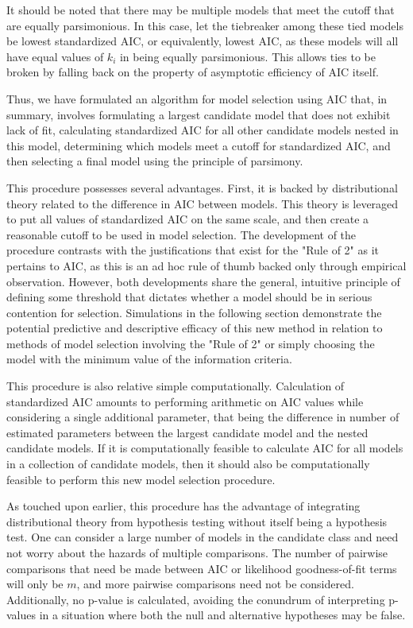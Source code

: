 		It should be noted that there may be multiple models that meet the cutoff that are equally parsimonious. In this case, let the tiebreaker among these tied models be
		lowest standardized AIC, or equivalently, lowest AIC, as these models will all have equal values of $k_i$ in being equally parsimonious. This allows ties to be broken
		by falling back on the property of asymptotic efficiency of AIC itself.

		Thus, we have formulated an algorithm for model selection using AIC that, in summary, involves formulating a largest candidate model that does not exhibit lack of
		fit, calculating standardized AIC for all other candidate models nested in this model, determining which models meet a cutoff for standardized AIC, and then selecting
		a final model using the principle of parsimony.

		This procedure possesses several advantages. First, it is backed by distributional theory related to the difference in AIC between models. This theory is leveraged
		to put all values of standardized AIC on the same scale, and then create a reasonable cutoff to be used in model selection. The development of the procedure
		contrasts with the justifications that exist for the "Rule of 2" as it pertains to AIC, as this is an ad hoc rule of thumb backed only through empirical
		observation. However, both developments share the general, intuitive principle of defining some threshold that dictates whether a model should be in serious
		contention for selection. Simulations in the following section demonstrate the potential predictive and descriptive efficacy of this new method in relation
		to methods of model selection involving the "Rule of 2" or simply choosing the model with the minimum value of the information criteria.
		
		This procedure is also relative simple computationally. Calculation of standardized AIC amounts to performing arithmetic on AIC values while considering
		a single additional parameter, that being the difference in number of estimated parameters between the largest candidate model and the nested candidate 
		models. If it is computationally feasible to calculate AIC for all models in a collection of candidate models, then it should also be computationally
		feasible to perform this new model selection procedure.
		
		As touched upon earlier, this procedure has the advantage of integrating distributional theory from hypothesis testing without itself being a hypothesis test.
		One can consider a large number of models in the candidate class and need not worry about the hazards of multiple comparisons. The number of pairwise comparisons
		that need be made between AIC or likelihood goodness-of-fit terms will only be $m$, and more pairwise comparisons need not be considered. Additionally, no p-value
		is calculated, avoiding the conundrum of interpreting p-values in a situation where both the null and alternative hypotheses may be false.

